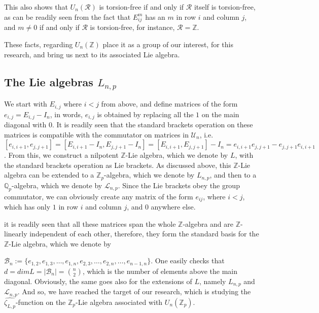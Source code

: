 \documentclass[12pt]{article}
\begin{document}
This also shows that $U_n(\mathcal{R})$ is torsion-free if and only if $\mathcal{R}$ itself is torsion-free, as can be readily seen from the fact that $E_{ij}^m$ has an $m$ in row $i$ and column $j$, and $m\neq 0$ if and only if $\mathcal{R}$ is torsion-free, for instance, $\mathcal{R}=\mathbb{Z}$.\par
These facts, regarding $U_n(\mathbb{Z})$ place it as a group of our interest, for this research, and bring us next to its associated Lie algebra.
\subsection{The Lie algebras $L_{n,p}$}
We start with $E_{i,j}$ where $i<j$ from above, and define matrices of the form $e_{i,j}=E_{i,j}-I_n$, in words, $e_{i,j}$ is obtained by replacing all the $1$ on the main diagonal with $0$. It is readily seen that the standard brackets operation on these matrices is compatible with the commutator on matrices in $\mathcal{U}_n$, i.e. $[e_{i,i+1},e_{j,j+1}]=[E_{i,i+1}-I_n,E_{j,j+1}-I_n]=[E_{i,i+1},E_{j,j+1}]-I_n=e_{i,i+1}e_{j,j+1}-e_{j,j+1}e_{i,i+1}$. From this, we construct a nilpotent $\mathbb{Z}$-Lie algebra, which we denote by $L$, with the standard brackets operation as Lie brackets. As discussed above, this $\mathbb{Z}$-Lie algebra can be extended to a $\mathbb{Z}_p$-algebra, which we denote by $L_{n,p}$, and then to a $\mathbb{Q}_p$-algebra, which we denote by $\mathcal{L}_{n,p}$.
Since the Lie brackets obey the group commutator, we can obviously create any matrix of the form $e_{ij}$, where $i<j$, which has only $1$ in row $i$ and column $j$, and $0$ anywhere else.\par
it is readily seen that all these matrices span the whole $\mathbb{Z}$-algebra and are $\mathbb{Z}$-linearly independent of each other, therefore, they form the standard basis for the $\mathbb{Z}$-Lie algebra, which we denote by\par $\mathcal{B}_n:=\{e_{1,2},e_{1,3},\dots,e_{1,n},e_{2,3},\dots,e_{2,n},\dots,e_{n-1,n}\}$. One easily checks that $d=dimL=|\mathcal{B}_n|=\binom{n}{2}$, which is the number of elements above the main diagonal. Obviously, the same goes also for the extensions of $L$, namely $L_{n,p}$ and $\mathcal{L}_{n,p}$. And so, we have reached the target of our research, which is studying the $\hat{\zeta_{L,p}}$-function on the $\mathbb{Z}_p$-Lie algebra associated with $U_n(\mathbb{Z}_p)$.
\end{document}
